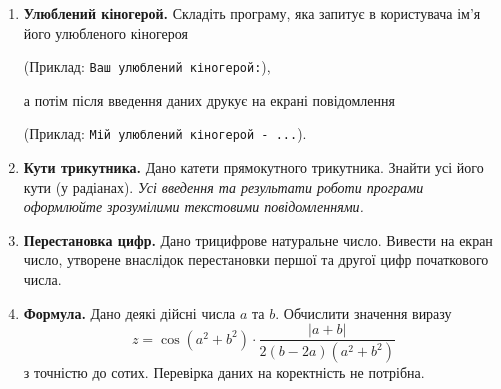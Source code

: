 \begin{enumerate}

\item \textbf{Улюблений кіногерой.} Складіть програму, яка запитує в користувача ім'я його улюбленого кіногероя

(Приклад: \verb|Ваш улюблений кіногерой:|),

а потім після введення даних друкує на екрані повідомлення

(Приклад: \verb|Мій улюблений кіногерой - ...|).

\item \textbf{Кути трикутника.} Дано катети прямокутного трикутника. Знайти усі його кути (у радіанах).
{\itshape Усі введення та результати роботи програми оформлюйте зрозумілими текстовими повідомленнями.}

\item \textbf{Перестановка цифр.} Дано трицифрове натуральне число. Вивести на екран число, утворене внаслідок перестановки першої та другої цифр початкового числа.

\item \textbf{Формула.} Дано деякі дійсні числа $a$ та $b$. Обчислити значення виразу
$$
z=\cos(a^2+b^2)\cdot\dfrac{|a+b|}{2(b-2a)(a^2+b^2)}
$$
з точністю до сотих. Перевірка даних на коректність не потрібна.
\end{enumerate}




